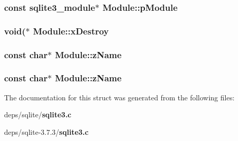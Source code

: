 \subsubsection{\setlength{\rightskip}{0pt plus 5cm}const \bf{sqlite3\_\-module}$\ast$ \bf{Module::p\-Module}}\label{structModule_e86c20048a5af64b6e6307f5779b8bac}


\subsubsection{\setlength{\rightskip}{0pt plus 5cm}void($\ast$ \bf{Module::x\-Destroy}}\label{structModule_e287af241eb1959a382cbd447cb34acd}


\subsubsection{\setlength{\rightskip}{0pt plus 5cm}const char$\ast$ \bf{Module::z\-Name}}\label{structModule_21c091b4e0102830d7fe2cdb6aaced5b}


\subsubsection{\setlength{\rightskip}{0pt plus 5cm}const char$\ast$ \bf{Module::z\-Name}}\label{structModule_21c091b4e0102830d7fe2cdb6aaced5b}




The documentation for this struct was generated from the following files:\begin{CompactItemize}
\item 
deps/sqlite/\bf{sqlite3.c}\item 
deps/sqlite-3.7.3/\bf{sqlite3.c}\end{CompactItemize}
